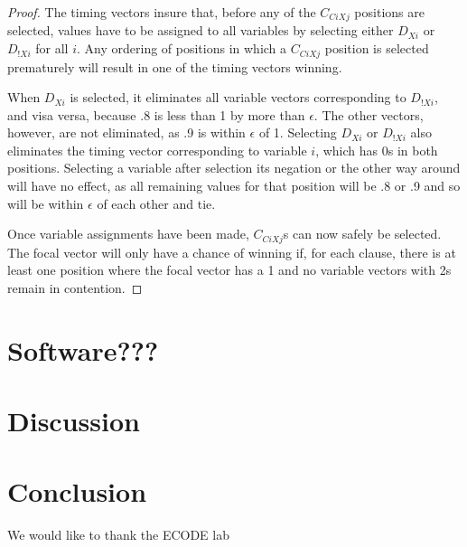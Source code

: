 \documentclass[sigconf]{acmart}
\begin{document}
\begin{proof}
The timing vectors insure that, before any of the $C_{CiXj}$ positions are selected, values have to be assigned to all variables by selecting either $D_{Xi}$ or $D_{!Xi}$ for all $i$. Any ordering of positions in which a $C_{CiXj}$ position is selected prematurely will result in one of the timing vectors winning.

When $D_{Xi}$ is selected, it eliminates all variable vectors corresponding to $D_{!Xi}$, and visa versa, because .8 is less than 1 by more than $\epsilon$. The other vectors, however, are not eliminated, as .9 is within $\epsilon$ of 1. Selecting $D_{Xi}$ or $D_{!Xi}$ also eliminates the timing vector corresponding to variable $i$, which has 0s in both positions. Selecting a variable after selection its negation or the other way around will have no effect, as all remaining values for that position will be .8 or .9 and so will be within $\epsilon$ of each other and tie.

Once variable assignments have been made, $C_{CiXj}$s can now safely be selected. The focal vector will only have a chance of winning if, for each clause, there is at least one position where the focal vector has a 1 and no variable vectors with 2s remain in contention.


\end{proof}

\section{Software???}

\section{Discussion}



\section{Conclusion}

\begin{acks}
We would like to thank the ECODE lab
\end{acks}
\end{document}
